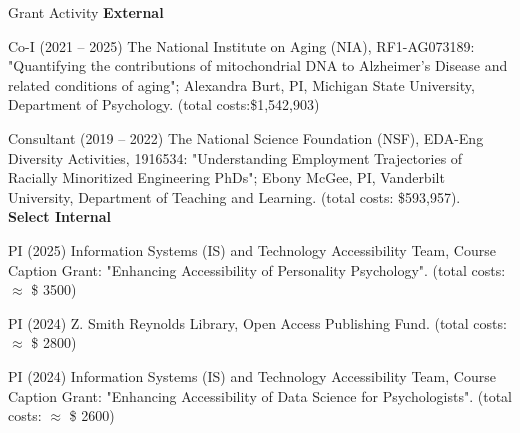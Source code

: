 \begin{rSection}{\textrm{Grant Activity}}%
{\large \textbf{External}}%
\begin{etaremune}
\item Co-I (2021 – 2025) The National Institute on Aging (NIA), RF1-AG073189: "Quantifying the contributions of mitochondrial DNA to Alzheimer's Disease and related conditions of aging"; Alexandra Burt, PI, Michigan State University, Department of Psychology. (total costs:\$1,542,903)%

\item Consultant (2019 – 2022) The National Science Foundation (NSF), EDA-Eng Diversity Activities, 1916534: "Understanding Employment Trajectories of Racially Minoritized Engineering PhDs"; Ebony McGee, PI, Vanderbilt University, Department of Teaching and Learning. (total costs: \$593,957).
\smallskip\\
\hspace*{-8mm}\large{\bf{Select Internal}}%
\item PI (2025) Information Systems (IS) and Technology Accessibility Team, Course Caption Grant: "Enhancing Accessibility of Personality Psychology". (total costs: $\approx$ \$ 3500)%
\item PI (2024) Z. Smith Reynolds Library, Open Access Publishing Fund. (total costs: $\approx$ \$ 2800) %
\item PI (2024) Information Systems (IS) and Technology Accessibility Team, Course Caption Grant: "Enhancing Accessibility of Data Science for Psychologists". (total costs: $\approx$ \$ 2600)%
\end{etaremune}
\end{rSection}